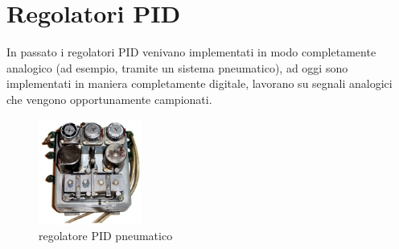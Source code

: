 \documentclass[10pt, letterpaper]{report}
\begin{document}
\chapter{Regolatori PID}\label{regolatoriPID}
In passato i regolatori PID venivano implementati in modo completamente analogico (ad esempio, tramite un sistema pneumatico), ad oggi sono implementati in maniera completamente digitale, lavorano su segnali analogici che vengono opportunamente campionati.\acc
\begin{figure}[h!]
    \centering 
    \includegraphics[width=0.3\textwidth]{images/pidPneumatico.png}
    \caption{regolatore PID pneumatico}
\end{figure}
\end{document}
